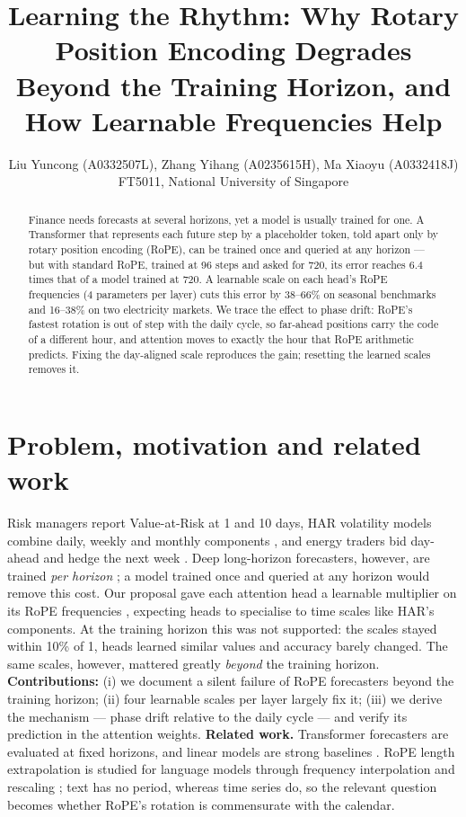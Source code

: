 \documentclass[12pt]{article}
\title{\vspace{-1.7cm}\textbf{Learning the Rhythm: Why Rotary Position Encoding Degrades Beyond the Training Horizon, and How Learnable Frequencies Help}}
\author{{\normalsize Liu Yuncong (A0332507L), Zhang Yihang (A0235615H), Ma Xiaoyu (A0332418J)}\\{\normalsize FT5011, National University of Singapore}}
\date{\vspace{-1.0cm}}
\begin{document}
\maketitle

\begin{abstract}\noindent
Finance needs forecasts at several horizons, yet a model is usually trained for one.
A Transformer that represents each future step by a placeholder token, told apart only by rotary position encoding (RoPE), can be trained once and queried at any horizon --- but with standard RoPE, trained at 96 steps and asked for 720, its error reaches 6.4 times that of a model trained at 720.
A learnable scale on each head's RoPE frequencies (4 parameters per layer) cuts this error by 38--66\% on seasonal benchmarks and 16--38\% on two electricity markets.
We trace the effect to phase drift: RoPE's fastest rotation is out of step with the daily cycle, so far-ahead positions carry the code of a different hour, and attention moves to exactly the hour that RoPE arithmetic predicts.
Fixing the day-aligned scale reproduces the gain; resetting the learned scales removes it.
\end{abstract}

\section{Problem, motivation and related work}
Risk managers report Value-at-Risk at 1 and 10 days, HAR volatility models combine daily, weekly and monthly components \cite{corsi2009}, and energy traders bid day-ahead and hedge the next week \cite{weron2014}.
Deep long-horizon forecasters, however, are trained \emph{per horizon} \cite{zeng2023dlinear,nie2023patchtst}; a model trained once and queried at any horizon would remove this cost.
Our proposal gave each attention head a learnable multiplier on its RoPE frequencies \cite{su2021roformer}, expecting heads to specialise to time scales like HAR's components.
At the training horizon this was not supported: the scales stayed within 10\% of 1, heads learned similar values and accuracy barely changed.
The same scales, however, mattered greatly \emph{beyond} the training horizon.
\textbf{Contributions:} (i) we document a silent failure of RoPE forecasters beyond the training horizon; (ii) four learnable scales per layer largely fix it; (iii) we derive the mechanism --- phase drift relative to the daily cycle --- and verify its prediction in the attention weights.
\textbf{Related work.} Transformer forecasters \cite{zhou2021informer,nie2023patchtst} are evaluated at fixed horizons, and linear models are strong baselines \cite{zeng2023dlinear}.
RoPE length extrapolation is studied for language models through frequency interpolation and rescaling \cite{peng2024yarn}; text has no period, whereas time series do, so the relevant question becomes whether RoPE's rotation is commensurate with the calendar.
\end{document}
